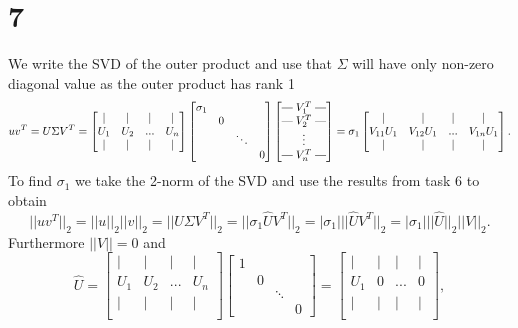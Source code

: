 \documentclass{article}
\makeatletter
\newcommand{\brows}[1]{%
  \begin{bmatrix}
  \begin{array}{@{\protect\rotvert\;}c@{\;\protect\rotvert}}
  #1
  \end{array}
  \end{bmatrix}
}
\newcommand{\rotvert}{\rotatebox[origin=c]{90}{$\vert$}}
\newcommand{\rowsvdots}{\multicolumn{1}{@{}c@{}}{\vdots}}
\makeatother
\begin{document}
\section*{7}
We write the SVD of the outer product and use that $\Sigma$ will have only non-zero diagonal value as the outer product has rank 1
\begin{align}
    u v ^ T = 
    U \Sigma V^T = 
    \begin{bmatrix}
    \vert & \vert & \vert & \vert \\
    U_1 & U_2 & ... & U_n \\
    \vert & \vert & \vert & \vert \\
    \end{bmatrix} 
    \begin{bmatrix}
    \sigma_1 & & &\\
    & 0 & & \\
    & & \ddots & \\
    & & & 0
    \end{bmatrix}
    \brows{V_1^T \\ V_2^T \\ \rowsvdots \\ V_n^T}
    =
    \sigma_1 
    \begin{bmatrix}
    \vert & \vert & \vert & \vert \\
    V_{11} U_1 & V_{12} U_1 & ... & V_{1n} U_1 \\
    \vert & \vert & \vert & \vert \\
    \end{bmatrix}. 
\end{align}
To find $\sigma_1$ we take the 2-norm of the SVD and use the results from task 6 to obtain
\begin{equation}
    || u v^T ||_2 = 
    || u ||_2  || v ||_2 = 
    || U \Sigma V^T ||_2 = 
    ||\sigma_1 \hat{U} V^T ||_2 = 
    |\sigma_1| || \hat{U} V^T ||_2 = 
    |\sigma_1| || \hat{U} ||_2 || V ||_2.
\end{equation}
Furthermore $||V||=0$ and
\begin{equation}
    \hat{U} = 
    \begin{bmatrix}
    \vert & \vert & \vert & \vert \\
    U_1 & U_2 & ... & U_n \\
    \vert & \vert & \vert & \vert \\
    \end{bmatrix} 
    \begin{bmatrix}
    1 & & &\\
    & 0 & & \\
    & & \ddots & \\
    & & & 0
    \end{bmatrix}
    = 
    \begin{bmatrix}
    \vert & \vert & \vert & \vert \\
    U_1 & 0 & ... & 0 \\
    \vert & \vert & \vert & \vert \\
    \end{bmatrix} 
    ,
\end{equation}
\end{document}
